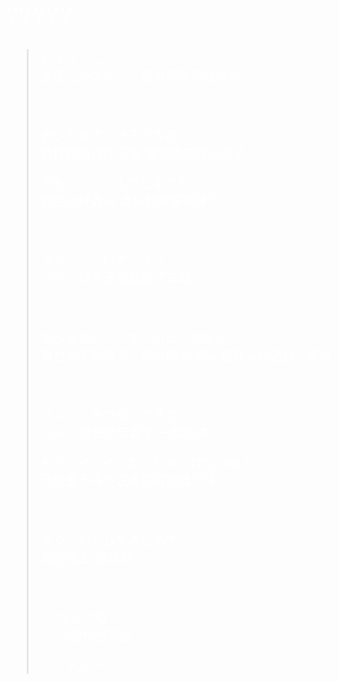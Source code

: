 \documentclass{article}
\theoremstyle{nonumberplain}
\begin{document}
\section*{\textcolor{white}{?????}}
\begin{quote}
	\textcolor{white}{いよけ　に\\
		该怎么办才好…！ 思念啊请传达给你}

	\ \par

	\textcolor{white}{おいをめて　きそうなの\\
		拜托时间请停下来 感觉快要哭出来了}

	\textcolor{white}{でもしくて　んでしまうわ！\\
		但是又好高兴 高兴到快要死掉了！}

	\ \par

	\textcolor{white}{メルト　にいてしまう……\\
		Melt　终究还是抵达了车站……}

	\ \par

	\textcolor{white}{もうえない　くて　いよ　だから\\
		再也见不到面了　那么的近 却又是那么的遥远　所以}

	\ \par

	\textcolor{white}{メルト　をつないできたい！\\
		Melt　想要手牵着手 一起前进！}

	\textcolor{white}{もうバイバイしなくちゃいけないの？\\
		已经是不得不说再见的时候了吗？}

	\ \par

	\textcolor{white}{すぐ　わたしをきしめて！\\
		现在马上 抱紧我！}

	\ \par

	\textcolor{white}{……なんてね\\
		……只是想想而已}
	\begin{flushright}\textcolor{white}{------メルト}\end{flushright}
\end{quote}
\newpage
\end{document}

